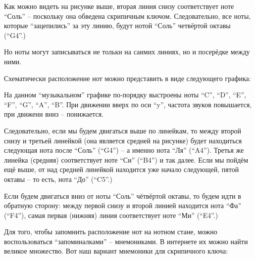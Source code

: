 \documentclass[a4paper,twoside]{book}
\begin{document}
Как можно видеть на рисунке выше, вторая линия снизу соответствует ноте ``Соль''
-- поскольку она обведена скрипичным ключом. Следовательно, все ноты, которые
``зацепились'' за эту линию, будут нотой ``Соль'' четвёртой октавы (``G4''.)

Но ноты могут записываться не толькн на саимих линиях, но и посерёдке между
ними.

Схематически расположение нот можно представить в виде следующего графика:


На данном ``музыкальном'' графике по-порядку выстроены ноты ``C'', ``D'', ``E'',
``F'', ``G'', ``A'', ``B''. При движении вверх по оси ``y'', частота звуков
повышается, при движени вниз -- понижается.

Следовательно, если мы будем двигаться выше по линейкам, то между второй снизу и
третьей линейкой (она является средней на рисунке) будет находиться следующая
нота после ``Соль'' (``G4'') -- а именно нота ``Ля'' (``A4''). Третья же линейка
(средняя) соответствует ноте ``Си'' (``B4'') и так далее. Если мы пойдём ещё
выше, от над средней линейкой находится уже начало следующей, пятой октавы -- то
есть, нота ``До'' (``C5''.)

Если будем двигаться вниз от ноты ``Соль'' чётвёртой октавы, то будем идти в
обратную сторону: между первой снизу и второй линией находится нота ``Фа''
(``F4''), самая первая (нижняя) линия соответствует ноте ``Ми'' (``E4''.)

Для того, чтобы запомнить расположение нот на нотном стане, можно
воспользоваться ``запоминалками'' -- мнемониками. В интернете их можно найти
великое множество. Вот наш вариант мнемоники для скрипичного ключа:

\end{document}
